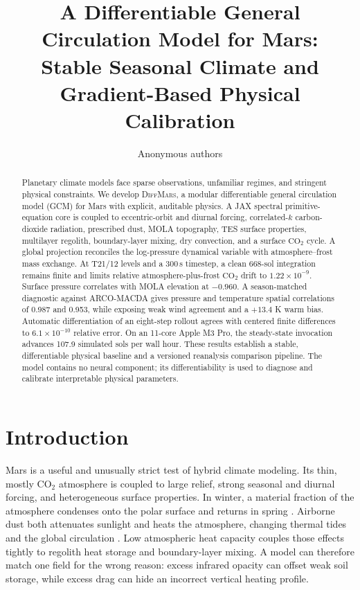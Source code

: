 \documentclass{article}
\title{A Differentiable General Circulation Model for Mars:\\
Stable Seasonal Climate and Gradient-Based Physical Calibration}
\author{Anonymous authors}
\newcommand{\model}{\textsc{DiffMars}}
\begin{document}
\maketitle

\begin{abstract}
Planetary climate models face sparse observations, unfamiliar regimes, and
stringent physical constraints. We develop \model, a modular differentiable
general circulation model (GCM) for Mars with explicit, auditable physics. A JAX spectral
primitive-equation core is coupled to eccentric-orbit and diurnal forcing,
correlated-\(k\) carbon-dioxide radiation, prescribed dust, MOLA topography, TES
surface properties, multilayer regolith, boundary-layer mixing, dry convection,
and a surface \(\mathrm{CO_2}\) cycle. A global projection reconciles the
log-pressure dynamical variable with atmosphere--frost mass exchange. At T21/12
levels and a 300\,s timestep, a clean 668-sol integration remains finite and
limits relative atmosphere-plus-frost \(\mathrm{CO_2}\) drift to
\(1.22\times10^{-9}\). Surface pressure correlates with MOLA elevation at
\(-0.960\). A season-matched diagnostic against ARCO-MACDA gives pressure and
temperature spatial correlations of 0.987 and 0.953, while exposing weak wind
agreement and a \(+13.4\) K warm bias. Automatic differentiation of an
eight-step rollout agrees with centered finite differences to
\(6.1\times10^{-10}\) relative error. On an 11-core Apple M3 Pro, the
steady-state invocation advances 107.9 simulated sols per wall hour. These
results establish a stable, differentiable physical baseline and a versioned
reanalysis comparison pipeline. The model contains no neural component; its
differentiability is used to diagnose and calibrate interpretable physical
parameters.
\end{abstract}

\section{Introduction}

Mars is a useful and unusually strict test of hybrid climate modeling. Its thin,
mostly \(\mathrm{CO_2}\) atmosphere is coupled to large relief, strong seasonal
and diurnal forcing, and heterogeneous surface properties. In winter, a material
fraction of the atmosphere condenses onto the polar surface and returns in
spring \citep{leighton1966co2,guo2009seasonal}. Airborne dust both attenuates
sunlight and heats the atmosphere, changing thermal tides and the global
circulation \citep{madeleine2011dust,montabone2015dust}. Low atmospheric heat
capacity couples those effects tightly to regolith heat storage and boundary-layer
mixing. A model can therefore match one field for the wrong reason: excess
infrared opacity can offset weak soil storage, while excess drag can hide an
incorrect vertical heating profile.
\end{document}
